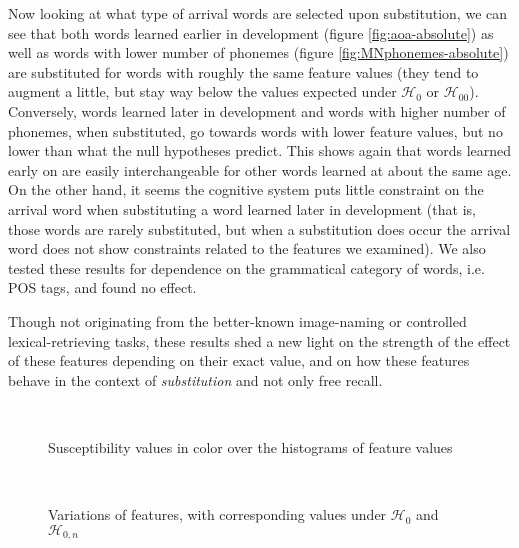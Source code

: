 Now looking at what type of arrival words are selected upon substitution, we can see that both words learned earlier in development (figure \ref{fig:aoa-absolute}) as well as words with lower number of phonemes (figure \ref{fig:MNphonemes-absolute}) are substituted for words with roughly the same feature values (they tend to augment a little, but stay way below the values expected under $\mathcal{H}_0$ or $\mathcal{H}_{00}$). Conversely, words learned later in development and words with higher number of phonemes, when substituted, go towards words with lower feature values, but no lower than what the null hypotheses predict. This shows again that words learned early on are easily interchangeable for other words learned at about the same age. On the other hand, it seems the cognitive system puts little constraint on the arrival word when substituting a word learned later in development (that is, those words are rarely substituted, but when a substitution does occur the arrival word does not show constraints related to the features we examined). We also tested these results for dependence on the grammatical category of words, i.e. POS tags, and found no effect.

Though not originating from the better-known image-naming or controlled lexical-retrieving tasks, these results shed a new light on the strength of the effect of these features depending on their exact value, and on how these features behave in the context of \emph{substitution} and not only free recall.


\begin{figure*}[!th]
	\centering
	~
	\caption{Susceptibility values in color over the histograms of feature values}
\end{figure*}


\begin{figure*}[!th]
	\centering
	~
	\caption{Variations of features, with corresponding values under $\mathcal{H}_0$ and $\mathcal{H}_{0,n}$}
\end{figure*}


